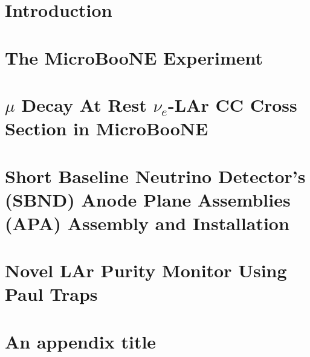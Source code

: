 \documentclass[twoside,openright,12pt,a4paper]{report}
\begin{document}
\capa
\folhadeaprovacao
\adedicatoria
\notaagradecimento
\acitacao
\tableofcontents
\listoffigures 
\listoftables
\linenumbers

\inicio

\chapter{Introduction}

\label{Chapter:1}

\chapter{The MicroBooNE Experiment}

\label{Chapter:2}

\chapter{$\mu$ Decay At Rest $\nu_{e}$-LAr CC Cross Section in MicroBooNE}

\label{Chapter:3}

\chapter{Short Baseline Neutrino Detector's (SBND) Anode Plane Assemblies (APA) Assembly and Installation}

\label{Chapter:4}

\chapter{Novel LAr Purity Monitor Using Paul Traps}

\label{Chapter:5}

\appendix %
\isappendixtrue %
\renewcommand\chaptername{Appendix}

\chapter{An appendix title}







\begin{thebibliography}{10}





\end{thebibliography}


\end{document}
